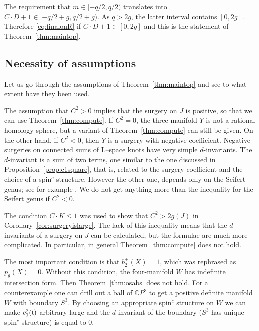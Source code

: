 \documentclass[11pt]{amsart}
\numberwithin{equation}{section}
\theoremstyle{plain}
\theoremstyle{definition}
\begin{document}
The requirement that $m\in[-q/2,q/2)$ translates into $C\cdot D+1\in[-q/2+g,q/2+g)$. As $q>2g$, the latter interval contains $[0,2g]$.
Therefore \eqref{eq:finalonR} if $C\cdot D+1\in[0,2g]$ and this is the statement of Theorem~\ref{thm:maintop}.

\subsection{Necessity of assumptions}

Let us go through the assumptions of Theorem~\ref{thm:maintop} and see to what extent have they been used.

The assumption that $C^2>0$ implies that the surgery on $J$ is positive, so that we can use Theorem~\ref{thm:compute}. If $C^2=0$, the three-manifold
$Y$ is not a rational homology sphere, but a variant of Theorem~\ref{thm:compute} can still be given. On the other hand, if $C^2<0$, then $Y$
is a surgery with negative coefficient. Negative surgeries on connected sums of L--space knots have very simple $d$-invariants. The $d$-invariant
is a sum of two terms, one similar to the one discussed in 
Proposition~\ref{prop:c1square}, that is, related to the surgery coefficient and the choice of  a {spin$^c$}{} structure. However the other one,
depends only on the Seifert genus; see for example \cite[Section 5]{Nem}.
We do not get anything more than the inequality for the Seifert genus if $C^2<0$.

\smallskip
The condition $C\cdot K\le 1$ was used to show that $C^2>2g(J)$ in Corollary~\ref{cor:surgeryislarge}. The lack of this inequality means that
the $d$--invariants of a surgery on $J$ can be calculated, but the formulae are much more complicated. In particular, in general
Theorem~\ref{thm:compute} does not hold.

\smallskip
The most important condition is that $b_2^+(X)=1$, which was rephrased as $p_g(X)=0$. Without this condition, the four-manifold $W$
has indefinite intersection form. Then Theorem~\ref{thm:osabs} does not hold. For a counterexample one can drill out a ball of ${\mathbb C} P^2$
to get a positive definite manifold $W$ with boundary $S^3$. By choosing an appropriate {spin$^c$}{} structure on $W$ we can make $c_1^2({\ifmmode{{\mathfrak t}}\else{${\mathfrak t}$\ }\fi})$
arbitrary large and the $d$-invariant of the boundary ($S^3$ has unique {spin$^c$}{} structure) is equal to 0.
\end{document}
